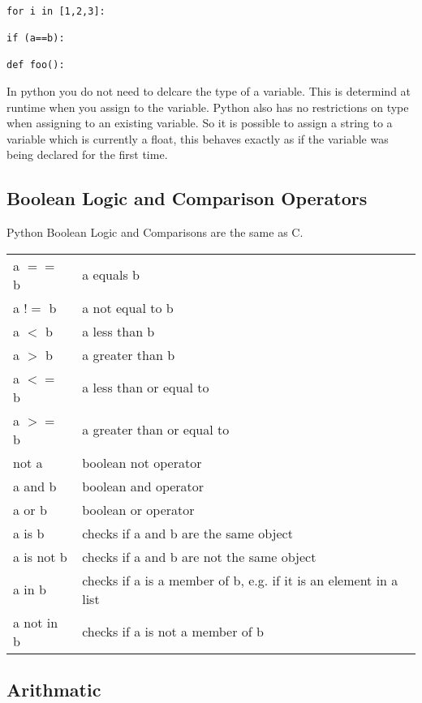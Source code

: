 \documentclass[11pt,a4paper]{article}
\begin{document}
\begin{verbatim}

for i in [1,2,3]:

if (a==b):

def foo():

\end{verbatim}

In python you do not need to delcare the type of a variable. This is determind at runtime when you assign to the variable. Python also has no restrictions on type when assigning to an existing variable. So it is possible to assign a string to a variable which is currently a float, this behaves exactly as if the variable was being declared for the first time.

\subsection{Boolean Logic and Comparison Operators}

Python Boolean Logic and Comparisons are the same as C.

\begin{center}
\begin{tabular}{l l}
a $==$ b & a equals b \\ 
a $!=$ b & a not equal to b \\
a $<$ b & a less than b \\
a $>$ b & a greater than b \\
a $<=$ b & a less than or equal to \\
a $>=$ b & a greater than or equal to \\
not a & boolean not operator \\
a and b & boolean and operator \\
a or b & boolean or operator \\
a is b & checks if a and b are the same object \\
a is not b & checks if a and b are not the same object \\
a in b & checks if a is a member of b, e.g. if it is an element in
a list \\
a not in b & checks if a is not a member of b\\
\end{tabular}
\end{center}


\subsection{Arithmatic}
\end{document}
